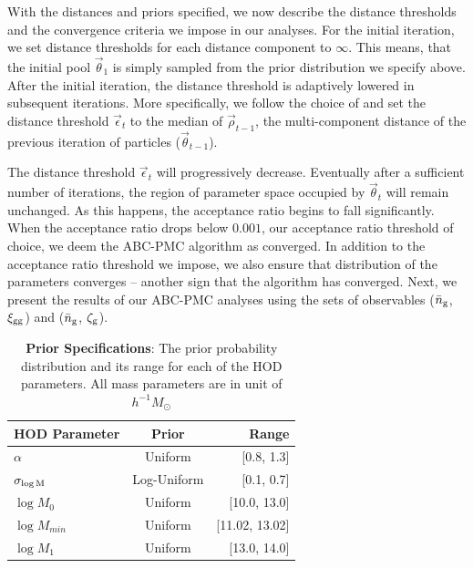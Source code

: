 \documentclass[fleqn,usenatbib]{mnras}
\newcommand{\pars}{\vec{\theta}}
\newcommand{\mstar}{h^{-1}M_\odot}
\begin{document}
With the distances and priors specified, we now describe the distance thresholds and the 
convergence criteria we impose in our analyses. For the initial iteration, we set distance
thresholds for each distance component to $\infty$. This means, that the initial pool 
$\vec\theta_1$ is simply sampled from the prior distribution we specify above. After the initial 
iteration, the distance threshold is adaptively lowered in subsequent iterations. More 
specifically, we follow the choice of \cite{abcwl} and set the distance threshold 
$\vec\epsilon_t$ to the median of $\vec\rho_{t-1}$, the multi-component distance of the 
previous iteration of particles ($\pars_{t-1}$).

The distance threshold $\vec\epsilon_t$ will progressively decrease. Eventually after a 
sufficient number of iterations, the region of parameter space occupied by $\pars_t$ 
will remain unchanged. As this happens, the acceptance ratio begins to fall significantly. 
When the acceptance ratio drops below $0.001$, our acceptance ratio threshold of choice, 
we deem the ABC-PMC algorithm as converged. In addition to the acceptance ratio threshold 
we impose, we also ensure that distribution of the parameters converges -- another sign 
that the algorithm has converged. Next, we present the results of our ABC-PMC analyses 
using the sets of observables ($\bar{n}_{\mathrm{g}}$, $\xi_{\mathrm{gg}}$) and ($\bar{n}_{\mathrm{g}}$, $\mathcal{\zeta}_{\rm g}$). 


\begin{table}
	\centering
	\caption{{\bf Prior Specifications}: The prior probability distribution 
  and its range for each of the \citet{zheng07} HOD parameters. All mass parameters are in unit of $\mstar$}
	\label{tab:prior}
	\begin{tabular}{lcr} %
		\hline
		HOD Parameter & Prior & Range\\
		\hline
		$\alpha$ & Uniform & [0.8, 1.3]\\
		$\sigma_{\rm \log M}$ & Log-Uniform & [0.1, 0.7]\\
		$\log M_{0}$ & Uniform & [10.0, 13.0]\\
        $\log M_{min}$ & Uniform & [11.02, 13.02]\\
        $\log M_{1}$ & Uniform & [13.0, 14.0]\\
		\hline
	\end{tabular}
\end{table}

\end{document}
